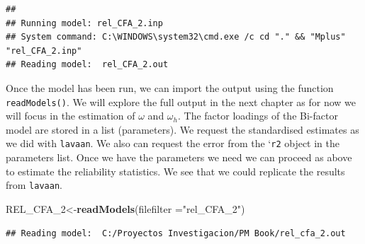 \documentclass[]{book}
\newenvironment{Shaded}{\begin{snugshade}}{\end{snugshade}}
\newcommand{\DataTypeTok}[1]{\textcolor[rgb]{0.13,0.29,0.53}{#1}}
\newcommand{\DecValTok}[1]{\textcolor[rgb]{0.00,0.00,0.81}{#1}}
\newcommand{\KeywordTok}[1]{\textcolor[rgb]{0.13,0.29,0.53}{\textbf{#1}}}
\newcommand{\NormalTok}[1]{#1}
\newcommand{\StringTok}[1]{\textcolor[rgb]{0.31,0.60,0.02}{#1}}
\begin{document}
\begin{verbatim}
## 
## Running model: rel_CFA_2.inp 
## System command: C:\WINDOWS\system32\cmd.exe /c cd "." && "Mplus" "rel_CFA_2.inp" 
## Reading model:  rel_CFA_2.out
\end{verbatim}

Once the model has been run, we can import the output using the function \texttt{readModels()}. We will explore the full output in the next chapter as for now we will focus in the estimation of \(\omega\) and \(\omega_h\). The factor loadings of the Bi-factor model are stored in a list (parameters). We request the standardised estimates as we did with \texttt{lavaan}. We also can request the error from the `\texttt{r2} object in the parameters list. Once we have the parameters we need we can proceed as above to estimate the reliability statistics. We see that we could replicate the results from \texttt{lavaan}.

\begin{Shaded}
\begin{Highlighting}[]
\NormalTok{REL_CFA_}\DecValTok{2}\NormalTok{<-}\KeywordTok{readModels}\NormalTok{(}\DataTypeTok{filefilter =}\StringTok{"rel_CFA_2"}\NormalTok{)}
\end{Highlighting}
\end{Shaded}

\begin{verbatim}
## Reading model:  C:/Proyectos Investigacion/PM Book/rel_cfa_2.out
\end{verbatim}
\end{document}
